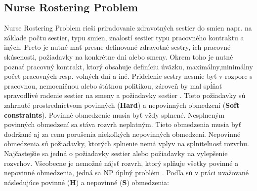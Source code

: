 \documentclass[a4paper, 14pt]{article}
\begin{document}
\subsection{Nurse Rostering Problem}
\label{seq:NurseRostering}
Nurse Rostering Problem rieši priraďovanie zdravotných sestier do smien napr. na základe počtu sestier, typu smien, znalostí sestier typu pracovného kontraktu a iných. Preto je nutné mať presne definované zdravotné sestry, ich pracovné skúsenosti, požiadavky na konkrétne dni alebo smeny. Okrem toho je nutné poznať pracovný kontrakt, ktorý obsahuje definíciu úväzku, maximálny,minimálny počet pracovných resp. volných dní a iné. Pridelenie sestry nesmie byť v rozpore s pracovnou, nemocničnou alebo štátnou politikou, zároveň by mal spĺňať spravodlivé radenie sestier na smeny a požiadavky sestier \cite{NursePolicies}. Tieto požiadavky sú zahrnuté prostredníctvom povinných (\textbf{Hard}) a nepovinných obmedzení (\textbf{Soft constraints}). Povinné obmedzenie musia byť vždy splnené. Nesplneným povinných obmedzení sa stáva rozvrh neplatným. Tieto obmedzenia musia byť dodržané aj za cenu porušenia niekoľkých nepovinných obmedzení. Nepovinné obmedzenia sú požiadavky, ktorých splnenie nemá vplyv na splniteľnosť rozvrhu. Najčastejšie sa jedná o požiadavky sestier alebo požiadavky na vylepšenie rozvrhov. Všeobecne je nemožné nájsť rozvrh, ktorý splňuje všetky povinné a nepovinné obmedzenia, jedná sa NP úplný problém \cite{NPProblem}. Podľa \cite{MainArticle} sú v práci uvažované následujúce povinné (\textbf{H}) a nepovinné (\textbf{S}) obmedzenia:
\end{document}
